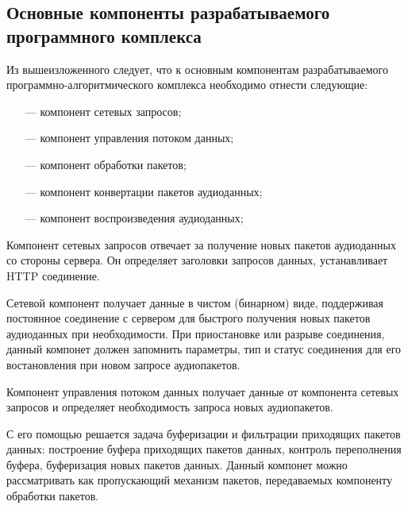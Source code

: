     \subsection{Основные компоненты разрабатываемого программного комплекса}
        \par Из вышеизложенного следует, 
        что к основным компонентам разрабатываемого программно-алгоритмического 
        комплекса необходимо отнести следующие:
        \begin{itemize}
            \item[---] компонент сетевых запросов;
            \item[---] компонент управления потоком данных;
            \item[---] компонент обработки пакетов;
            \item[---] компонент конвертации пакетов аудиоданных;
            \item[---] компонент воспроизведения аудиоданных;
        \end{itemize}

            \par Компонент сетевых запросов отвечает за получение новых пакетов аудиоданных со стороны сервера.
            Он определяет заголовки запросов данных, устанавливает HTTP соединение.
            
            \par Сетевой компонент получает данные в чистом (бинарном) виде, поддерживая постоянное соединение с сервером для
            быстрого получения новых пакетов аудиоданных при необходимости. При приостановке или разрыве соединения, 
            данный компонет должен запомнить параметры, тип и статус соединения для его востановления при новом запросе аудиопакетов. 

            \par Компонент управления потоком данных получает данные от компонента сетевых запросов 
            и определяет необходимость запроса новых аудиопакетов. 
            
            \par С его помощью решается задача буферизации и фильтрации приходящих пакетов данных:
            построение буфера приходящих пакетов данных, контроль переполнения буфера, буферизация новых пакетов данных.
            Данный компонет можно рассматривать как пропускающий механизм пакетов, передаваемых
            компоненту обработки пакетов.
            
